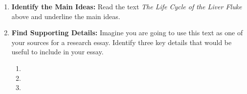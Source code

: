 \documentclass[12pt]{article}
\begin{document}
\vspace{2em}

\begin{tcolorbox}[colframe=black!60, colback=white, 
coltitle=black, colbacktitle=black!15, fonttitle=\bfseries\Large, 
title=Guided Practice, halign title=center, left=10pt, right=10pt, top=10pt, bottom=15pt]

\vspace{0.5cm}

\begin{enumerate}[itemsep=1em] %
    \item \textbf{Identify the Main Ideas:} Read the text \textit{The Life Cycle of the Liver Fluke} above and underline the main ideas.
    \item \textbf{Find Supporting Details:} Imagine you are going to use this text as one of your sources for a research essay. Identify three key details that would be useful to include in your essay.
        \begin{enumerate}
            \item 


\item 
\vspace{2cm}
\item 
\vspace{2cm}
        \end{enumerate}

      
\end{enumerate}
\vspace{2cm}
\end{tcolorbox}
\end{document}
